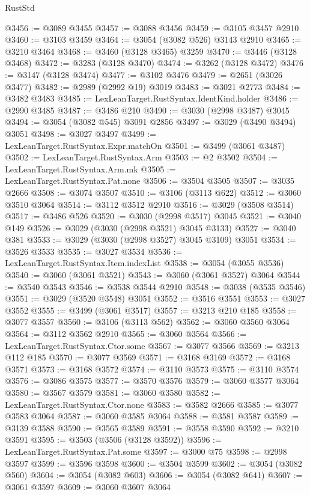\begin{lexlean}{RustStd}
\begin{coremodule}
@3456 := @3089 @3455
@3457 := @3088 @3456
@3459 := @3105 @3457 @2910
@3460 := @3103 @3459
@3464 := @3054 (@3082 @526) @3143 @2910
@3465 := @3210 @3464
@3468 := @3460 (@3128 @3465) @3259
@3470 := @3446 (@3128 @3468)
@3472 := @3283 (@3128 @3470)
@3474 := @3262 (@3128 @3472)
@3476 := @3147 (@3128 @3474)
@3477 := @3102 @3476
@3479 := @2651 (@3026 @3477)
@3482 := @2989 (@2992 @19) @3019
@3483 := @3021 @2773
@3484 := @3482 @3483
@3485 := LexLeanTarget.RustSyntax.IdentKind.holder
@3486 := @2990 @3485
@3487 := @3486 @210
@3490 := @3030 (@2998 @3487) @3045
@3494 := @3054 (@3082 @545) @3091 @2856
@3497 := @3029 (@3490 @3494) @3051
@3498 := @3027 @3497
@3499 := LexLeanTarget.RustSyntax.Expr.matchOn
@3501 := @3499 (@3061 @3487)
@3502 := LexLeanTarget.RustSyntax.Arm
@3503 := @2 @3502
@3504 := LexLeanTarget.RustSyntax.Arm.mk
@3505 := LexLeanTarget.RustSyntax.Pat.none
@3506 := @3504 @3505
@3507 := @3035 @2666
@3508 := @3074 @3507
@3510 := @3106 (@3113 @622)
@3512 := @3060 @3510 @3064
@3514 := @3112 @3512 @2910
@3516 := @3029 (@3508 @3514)
@3517 := @3486 @526
@3520 := @3030 (@2998 @3517) @3045
@3521 := @3040 @149
@3526 := @3029 (@3030 (@2998 @3521) @3045 @3133)
@3527 := @3040 @381
@3533 := @3029 (@3030 (@2998 @3527) @3045 @3109) @3051
@3534 := @3526 @3533
@3535 := @3027 @3534
@3536 := LexLeanTarget.RustSyntax.Item.indexList
@3538 := @3054 (@3055 @3536)
@3540 := @3060 (@3061 @3521)
@3543 := @3060 (@3061 @3527) @3064
@3544 := @3540 @3543
@3546 := @3538 @3544 @2910
@3548 := @3038 (@3535 @3546)
@3551 := @3029 (@3520 @3548) @3051
@3552 := @3516 @3551
@3553 := @3027 @3552
@3555 := @3499 (@3061 @3517)
@3557 := @3213 @210 @185
@3558 := @3077 @3557
@3560 := @3106 (@3113 @562)
@3562 := @3060 @3560 @3064
@3564 := @3112 @3562 @2910
@3565 := @3060 @3564
@3566 := LexLeanTarget.RustSyntax.Ctor.some
@3567 := @3077 @3566
@3569 := @3213 @112 @185
@3570 := @3077 @3569
@3571 := @3168 @3169
@3572 := @3168 @3571
@3573 := @3168 @3572
@3574 := @3110 @3573
@3575 := @3110 @3574
@3576 := @3086 @3575
@3577 := @3570 @3576
@3579 := @3060 @3577 @3064
@3580 := @3567 @3579
@3581 := @3060 @3580
@3582 := LexLeanTarget.RustSyntax.Ctor.none
@3583 := @3582 @2666
@3585 := @3077 @3583 @3064
@3587 := @3060 @3585 @3064
@3588 := @3581 @3587
@3589 := @3139 @3588
@3590 := @3565 @3589
@3591 := @3558 @3590
@3592 := @3210 @3591
@3595 := @3503 (@3506 (@3128 @3592))
@3596 := LexLeanTarget.RustSyntax.Pat.some
@3597 := @3000 @75
@3598 := @2998 @3597
@3599 := @3596 @3598
@3600 := @3504 @3599
@3602 := @3054 (@3082 @560)
@3604 := @3054 (@3082 @603)
@3606 := @3054 (@3082 @641)
@3607 := @3061 @3597
@3609 := @3060 @3607 @3064

\end{coremodule}
\end{lexlean}
